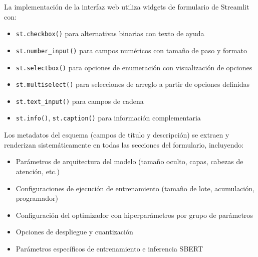 La implementación de la interfaz web utiliza widgets de formulario de Streamlit con:
\begin{itemize}[leftmargin=*]
    \item \texttt{st.checkbox()} para alternativas binarias con texto de ayuda
    \item \texttt{st.number\_input()} para campos numéricos con tamaño de paso y formato
    \item \texttt{st.selectbox()} para opciones de enumeración con visualización de opciones
    \item \texttt{st.multiselect()} para selecciones de arreglo a partir de opciones definidas
    \item \texttt{st.text\_input()} para campos de cadena
    \item \texttt{st.info()}, \texttt{st.caption()} para información complementaria
\end{itemize}

Los metadatos del esquema (campos de título y descripción) se extraen y renderizan sistemáticamente en todas las secciones del formulario, incluyendo:
\begin{itemize}[leftmargin=*]
    \item Parámetros de arquitectura del modelo (tamaño oculto, capas, cabezas de atención, etc.)
    \item Configuraciones de ejecución de entrenamiento (tamaño de lote, acumulación, programador)
    \item Configuración del optimizador con hiperparámetros por grupo de parámetros
    \item Opciones de despliegue y cuantización
    \item Parámetros específicos de entrenamiento e inferencia SBERT
\end{itemize}

